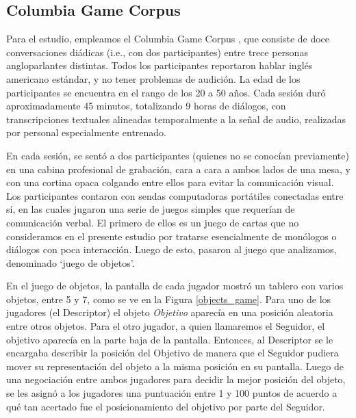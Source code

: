\subsection{Columbia Game Corpus}

\newcommand{\objectgame} {\emph{Juego de objetos}}


Para el estudio, empleamos el Columbia Game Corpus  \cite{GRAV2009}, que consiste de doce conversaciones diádicas (i.e., con dos participantes) entre trece personas angloparlantes distintas. Todos los participantes reportaron hablar inglés americano estándar, y no tener problemas de audición. La edad de los participantes se encuentra en el rango de los 20 a 50 años. Cada sesión duró aproximadamente 45 minutos, totalizando 9 horas de diálogos, con transcripciones textuales alineadas temporalmente a la señal de audio, realizadas por personal especialmente entrenado.

En cada sesión, se sentó a dos participantes (quienes no se conocían previamente) en una cabina profesional de grabación, cara a cara a ambos lados de una mesa, y con una cortina opaca colgando entre ellos para evitar la comunicación visual. Los participantes contaron con sendas computadoras portátiles conectadas entre sí, en las cuales jugaron una serie de juegos simples que requerían de comunicación verbal. El primero de ellos es un juego de cartas que no consideramos en el presente estudio por tratarse esencialmente de monólogos o diálogos con poca interacción. Luego de esto, pasaron al juego que analizamos, denominado `juego de objetos'.

En el juego de objetos, la pantalla de cada jugador mostró un tablero con varios objetos, entre 5 y 7, como se ve en la Figura \ref{objects_game}.
Para uno de los jugadores (el Descriptor) el objeto \emph{Objetivo} aparecía en una posición aleatoria entre otros objetos. Para el otro jugador, a quien llamaremos el Seguidor, el objetivo aparecía en la parte baja de la pantalla. Entonces, al Descriptor se le encargaba describir la posición del Objetivo de manera que el Seguidor pudiera mover su representación del objeto a la misma posición en su pantalla. Luego de una negociación entre ambos jugadores para decidir la mejor posición del objeto, se les asignó a los jugadores una puntuación entre 1 y 100 puntos de acuerdo a qué tan acertado fue el posicionamiento del objetivo por parte del Seguidor.


